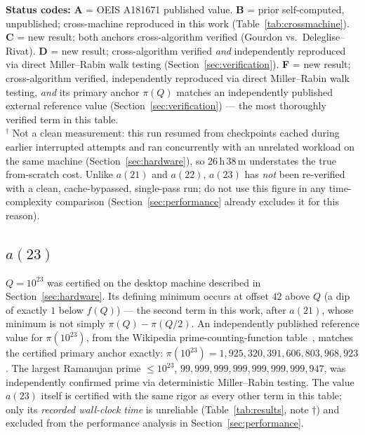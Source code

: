 \documentclass[11pt]{amsart}
\newcommand{\pcount}{\pi}
\begin{document}
\medskip
\noindent\footnotesize
\textbf{Status codes:}
\textbf{A} = OEIS A181671 published value.
\textbf{B} = prior self-computed, unpublished; cross-machine reproduced in this work (Table~\ref{tab:crossmachine}).
\textbf{C} = new result; both anchors cross-algorithm verified (Gourdon vs.\ Deleglise--Rivat).
\textbf{D} = new result; cross-algorithm verified \emph{and} independently reproduced via direct Miller--Rabin walk testing (Section~\ref{sec:verification}).
\textbf{F} = new result; cross-algorithm verified, independently reproduced via direct Miller--Rabin walk testing, \emph{and} its primary anchor $\pcount(Q)$ matches an independently published external reference value (Section~\ref{sec:verification}) --- the most thoroughly verified term in this table.\\
$^{\dagger}$ Not a clean measurement: this run resumed from checkpoints
cached during earlier interrupted attempts and ran concurrently with an
unrelated workload on the same machine (Section~\ref{sec:hardware}), so
26\,h\,38\,m understates the true from-scratch cost. Unlike $a(21)$ and
$a(22)$, $a(23)$ has \emph{not} been re-verified with a clean,
cache-bypassed, single-pass run; do not use this figure in any
time-complexity comparison (Section~\ref{sec:performance} already
excludes it for this reason).
\normalsize

\subsection{$a(23)$}
\label{sec:a23}

$Q=10^{23}$ was certified on the desktop machine described in
Section~\ref{sec:hardware}. Its defining minimum occurs at offset $42$
above $Q$ (a dip of exactly $1$ below $f(Q)$) --- the second term in
this work, after $a(21)$, whose minimum is not simply $\pcount(Q) -
\pcount(Q/2)$. An independently published reference value for
$\pcount(10^{23})$, from the Wikipedia prime-counting-function
table~\cite{wikipedia-picount}, matches the certified primary anchor
exactly: $\pcount(10^{23}) = 1{,}925{,}320{,}391{,}606{,}803{,}968{,}923$.
The largest Ramanujan prime $\leq 10^{23}$,
$99{,}999{,}999{,}999{,}999{,}999{,}999{,}947$, was independently
confirmed prime via deterministic Miller--Rabin testing. The value
$a(23)$ itself is certified with the same rigor as every other term in
this table; only its \emph{recorded wall-clock time} is unreliable
(Table~\ref{tab:results}, note $\dagger$) and excluded from the
performance analysis in Section~\ref{sec:performance}.
\end{document}
